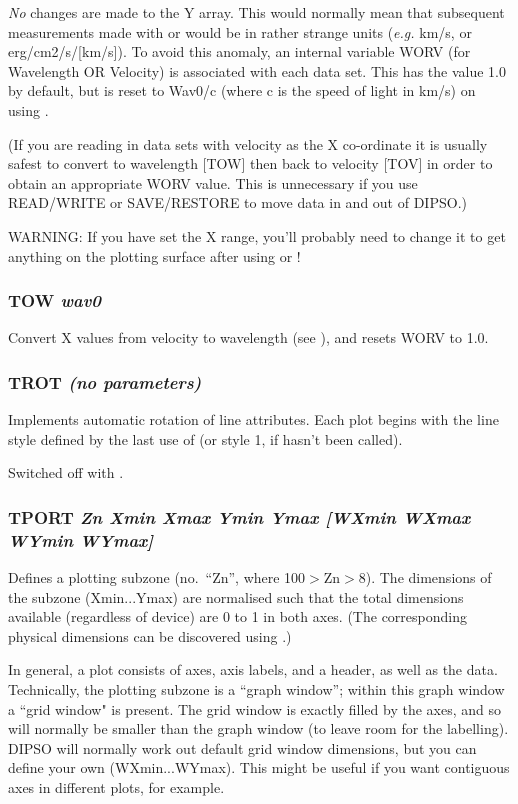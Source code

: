 \documentclass[twoside,11pt,noabs,nolof]{starlink}
\providecommand{\dipcom}[3]{\subsubsection*{\label{COM:#1}\xlabel{COM:#1}\textbf{#1} \emph{#2}}}
\begin{document}
\emph{No} changes are made to the Y array. This would normally mean
that subsequent measurements made with   or   would be in rather
strange units (\emph{e.g.} km/s, or erg/cm2/s/[km/s]). To avoid this
anomaly, an internal variable WORV (for Wavelength OR Velocity) is
associated with each data set. This has the value 1.0 by default, but
is reset to Wav0/c (where c is the speed of light in km/s) on using
.

(If you are reading in data sets with velocity as the X co-ordinate it
is usually safest to convert to wavelength [TOW] then back to velocity
[TOV] in order to obtain an appropriate WORV value. This is
unnecessary if you use READ/WRITE or SAVE/RESTORE to move data in and
out of DIPSO.)

WARNING: If you have set the X range, you'll probably need to change
it to get anything on the plotting surface after using   or !

\dipcom{TOW}{wav0}{Converts X values from velocity to wavelength }
Convert X values from velocity to wavelength (see ),  and resets
WORV to 1.0.

\dipcom{TROT}{(no parameters)}{Switches on automatic rotation of line style (i.e. attributes)}
Implements automatic rotation of line attributes. Each plot begins
with the line style defined by the last use of   (or style 1, if
  hasn't been called).

Switched off with .

\dipcom{TPORT}{Zn Xmin Xmax Ymin Ymax [WXmin WXmax WYmin WYmax]}{Defines a plotting sub-zone}
Defines a plotting subzone (no.\ ``Zn'', where 100$>$Zn$>$8). The
dimensions of the subzone (Xmin...Ymax) are normalised such that the
total dimensions available (regardless of device) are 0 to 1 in both
axes. (The corresponding physical dimensions can be discovered using
.)

In general, a plot consists of axes, axis labels, and a header, as
well as the data. Technically, the plotting subzone is a ``graph
window''; within this graph window a ``grid window" is present. The
grid window is exactly filled by the axes, and so will normally be
smaller than the graph window (to leave room for the labelling). DIPSO
will normally work out default grid window dimensions, but you can
define your own (WXmin...WYmax). This might be useful if you want
contiguous axes in different plots, for example.
\end{document}
